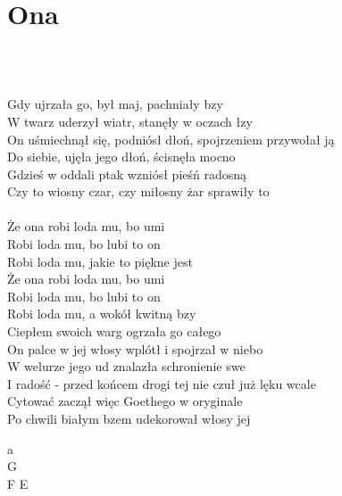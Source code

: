 \documentclass[a5paper, 10pt]{book}
\begin{document}
\section{Ona}\textcolor{lightgray}{\textit{}}\\~\\
\begin{minipage}[t]{0.8\textwidth}
Gdy ujrzała go, był maj, pachniały bzy\\
W twarz uderzył wiatr, stanęły w oczach łzy\\
On uśmiechnął się, podniósł dłoń, spojrzeniem przywołał ją\\
Do siebie, ujęła jego dłoń, ścisnęła mocno\\
Gdzieś w oddali ptak wzniósł pieśń radosną\\
Czy to wiosny czar, czy miłosny żar sprawiły to\\
\\
\hspace*{5mm}Że ona robi loda mu, bo umi\\
\hspace*{5mm}Robi loda mu, bo lubi to on\\
\hspace*{5mm}Robi loda mu, jakie to piękne jest\\
\hspace*{5mm}Że ona robi loda mu, bo umi\\
\hspace*{5mm}Robi loda mu, bo lubi to on\\
\hspace*{5mm}Robi loda mu, a wokół kwitną bzy\\

Ciepłem swoich warg ogrzała go całego\\
On palce w jej włosy wplótł i spojrzał w niebo\\
W welurze jego ud znalazła schronienie swe\\
I radość - przed końcem drogi tej nie czuł już lęku wcale\\
Cytować zaczął więc Goethego w oryginale\\
Po chwili białym bzem udekorował włosy jej\\

\end{minipage}
\begin{minipage}[t]{0.2\textwidth}
a\\
G\\
F E\\
\end{minipage}
\end{document}
